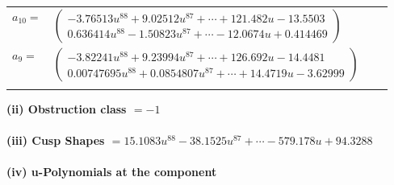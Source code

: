 \documentclass[1p]{elsarticle_modified}
\theoremstyle{definition}
\begin{document}
\begin{tabular}{m{7pt} m{180pt} m{7pt} m{180pt} }
\flushright $a_{10}=$&$\begin{pmatrix}-3.76513 u^{88}+9.02512 u^{87}+\cdots+121.482 u-13.5503\\0.636414 u^{88}-1.50823 u^{87}+\cdots-12.0674 u+0.414469\end{pmatrix}$ \\
\flushright $a_{9}=$&$\begin{pmatrix}-3.82241 u^{88}+9.23994 u^{87}+\cdots+126.692 u-14.4481\\0.00747695 u^{88}+0.0854807 u^{87}+\cdots+14.4719 u-3.62999\end{pmatrix}$\\&\end{tabular}
\flushleft \textbf{(ii) Obstruction class $= -1$}\\~\\
\flushleft \textbf{(iii) Cusp Shapes $= 15.1083 u^{88}-38.1525 u^{87}+\cdots-579.178 u+94.3288$}\\~\\
\newpage\renewcommand{\arraystretch}{1}
\flushleft \textbf{(iv) u-Polynomials at the component}\newline \\
\end{document}
